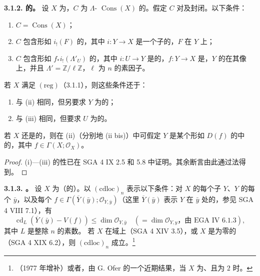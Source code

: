 \textbf{3.1.2. 的。} 设 $X$ 为，$C$ 为 $\Lambda$- $\operatorname{Cons}(X)$ 的。假定 $C$ 对及封闭。以下条件：
\begin{enumerate}
\item[(i)] $C=\operatorname{Cons}(X)$；
\item[(ii)] $C$ 包含形如 $i_!(F)$ 的，其中 $i:Y\to X$ 是一个子的，$F$ 在 $Y$ 上；
\item[(iii)] $C$ 包含形如 $f_*i_!(\Lambda'_U)$ 的，其中 $i:U\to Y$ 是的，$f:Y\to X$ 是，$Y$ 的在其像上，并且 $\Lambda'=\mathbb Z/\ell\mathbb Z$，$\ell$ 为 $n$ 的素因子。
\end{enumerate}
若 $X$ 满足 $(\mathrm{reg})$（3.1.1），则这些条件还于：
\begin{enumerate}
\item[(ii bis)] 与 (ii) 相同，但另要求 $Y$ 为的；
\item[(iii bis)] 与 (iii) 相同，但要求 $U$ 为的。
\end{enumerate}
若 $X$ 还是的，则在 (ii)（分别地 (ii bis)）中可假定 $Y$ 是某个形如 $D(f)$ 的中的，其中 $f\in\Gamma(X;\mathscr O_X)$。
\begin{proof}
(i)—(iii) 的性已在 SGA 4 IX 2.5 和 5.8 中证明。其余断言由此通过法得到。
\end{proof}
\textbf{3.1.3. 。} 设 $X$ 为（的）。以 $(\mathrm{cdloc})_n$ 表示以下条件：对 $X$ 的每个子 $Y$、$Y$ 的每个 $\bar y$，以及每个
$f\in\Gamma(\overline Y(\bar y);\mathscr O_{Y,\bar y})$（这里 $\overline Y(\bar y)$ 表示 $Y$ 在 $\bar y$ 处的，参见 SGA 4 VIII 7.1），有
\[
\operatorname{cd}_{L}(\overline Y(\bar y)-V(f))\leq\dim\mathscr O_{Y,\bar y}
\quad(=\dim\mathscr O_{Y,y}\text{，由 EGA IV 6.1.3}),
\]
其中 $L$ 是整除 $n$ 的素数。
若 $X$ 在域上（SGA 4 XIV 3.5），或 $X$ 是为零的（SGA 4 XIX 6.2），则 $(\mathrm{cdloc})_n$ 成立。\footnote{（1977 年增补）或者，由 G. Ofer 的一个近期结果，当 $X$ 为、且为 $2$ 时。}

